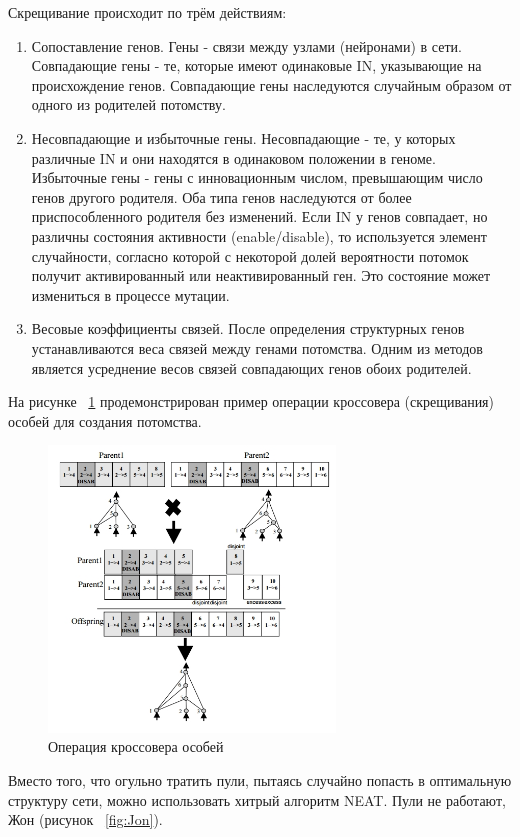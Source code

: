 \documentclass{article}
\begin{document}
Скрещивание происходит по трём действиям:
\begin{enumerate}
    \item Сопоставление генов. Гены - связи между узлами (нейронами) в сети. Совпадающие гены - те, которые имеют одинаковые IN, указывающие на происхождение генов. Совпадающие гены наследуются случайным образом от одного из родителей потомству.
    \item Несовпадающие и избыточные гены. Несовпадающие - те, у которых различные IN и они находятся в одинаковом положении в геноме. Избыточные гены - гены с инновационным числом, превышающим число генов другого родителя. Оба типа генов наследуются от более приспособленного родителя без изменений.
    Если IN у генов совпадает, но различны состояния активности (enable/disable), то используется элемент случайности, согласно которой с некоторой долей вероятности потомок получит активированный или неактивированный ген. Это состояние может измениться в процессе мутации.
    \item Весовые коэффициенты связей. После определения структурных генов устанавливаются веса связей между генами потомства. Одним из методов является усреднение весов связей совпадающих генов обоих родителей. 
\end{enumerate}

На рисунке ~\ref{fig:Neat2} продемонстрирован пример операции кроссовера (скрещивания) особей для создания потомства.

\begin{figure}[h]
	\centering
    \includegraphics[width=3in]{neat2}
    \caption{Операция кроссовера особей}
    \label{fig:Neat2}
\end{figure}

Вместо того, что огульно тратить пули, пытаясь случайно попасть в оптимальную структуру сети, можно использовать хитрый алгоритм NEAT. Пули не работают, Жон (рисунок ~\ref{fig:Jon}).
\end{document}
